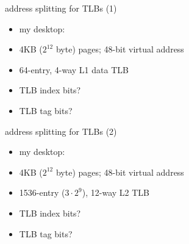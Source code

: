 \begin{frame}{address splitting for TLBs (1)}
\begin{itemize}
\item my desktop:
\item 4KB ($2^{12}$ byte) pages; 48-bit virtual address
\item 64-entry, 4-way L1 data TLB
\vspace{.5cm}
\item TLB index bits?
\iftoggle{heldback}{}{
    \begin{itemize}\item<2->$64/4 = 16$ sets --- 4 bits\end{itemize}
}
\item TLB tag bits?
\iftoggle{heldback}{}{
    \begin{itemize}\item<2->$48-12=36$ bit virtual page number ---  $36-4=32$ bit TLB tag\end{itemize}
}
\end{itemize}
\end{frame}

\begin{frame}{address splitting for TLBs (2)}
\begin{itemize}
\item my desktop:
\item 4KB ($2^{12}$ byte) pages; 48-bit virtual address
\item 1536-entry ($3\cdot 2^9$), 12-way L2 TLB
\vspace{.5cm}
\item TLB index bits?
\iftoggle{heldback}{}{
    \begin{itemize}\item<2->$1536/12 = 128$ sets --- 7 bits\end{itemize}
}
\item TLB tag bits?
\iftoggle{heldback}{}{
    \begin{itemize}\item<2->$48-12=36$ bit virtual page number ---  $36-7=29$ bit TLB tag\end{itemize}
}
\end{itemize}
\end{frame}

